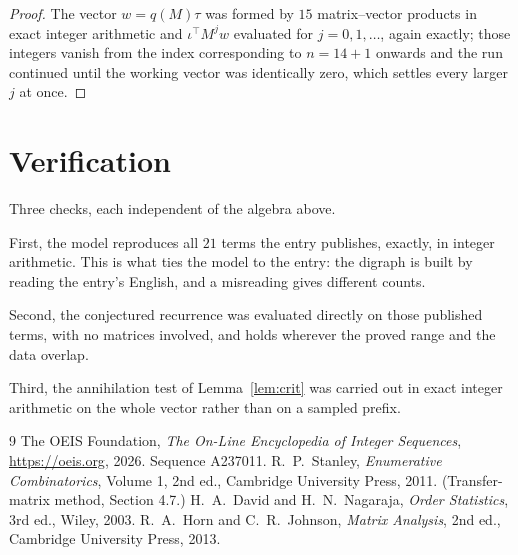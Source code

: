 \documentclass[11pt,a4paper]{article}
\theoremstyle{plain}
\theoremstyle{definition}
\begin{document}
\begin{proof}
The vector $w=q(M)\tau$ was formed by $15$ matrix--vector products in exact integer
arithmetic and $\iota^{\!\top}M^{j}w$ evaluated for $j=0,1,\dots$, again exactly; those
integers vanish from the index corresponding to $n=14+1$ onwards and the run continued
until the working vector was identically zero, which settles every larger $j$ at once.
\end{proof}

\section{Verification}

Three checks, each independent of the algebra above.

First, the model reproduces all $21$ terms the entry publishes, exactly, in integer
arithmetic. This is what ties the model to the entry: the digraph is built by reading the
entry's English, and a misreading gives different counts.

Second, the conjectured recurrence was evaluated directly on those published terms, with no
matrices involved, and holds wherever the proved range and the data overlap.

Third, the annihilation test of Lemma~\ref{lem:crit} was carried out in exact integer
arithmetic on the whole vector rather than on a sampled prefix.

\begin{thebibliography}{9}
 The OEIS Foundation, \emph{The On-Line Encyclopedia of Integer
Sequences}, \url{https://oeis.org}, 2026. Sequence A237011.
 R.~P.~Stanley, \emph{Enumerative Combinatorics}, Volume 1, 2nd ed.,
Cambridge University Press, 2011. (Transfer-matrix method, Section 4.7.)
 H.~A.~David and H.~N.~Nagaraja, \emph{Order Statistics}, 3rd ed., Wiley,
2003.
 R.~A.~Horn and C.~R.~Johnson, \emph{Matrix Analysis}, 2nd ed., Cambridge
University Press, 2013.
\end{thebibliography}
\end{document}
